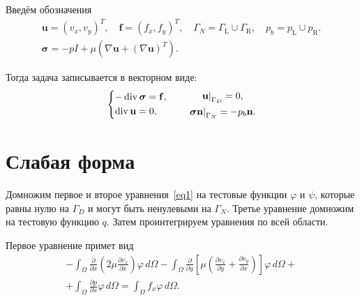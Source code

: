 \documentclass[a4paper,14pt]{extarticle}
\begin{document}
Введём обозначения
\begin{equation}
	\begin{gathered}
	\mathbf u=(v_x,v_y)^T,
	\quad
	\mathbf f=(f_x,f_y)^T,
	\quad
	\Gamma_N=\Gamma_{\mathrm L}\cup\Gamma_{\mathrm R},
	\quad
	p_b=p_{\mathrm L}\cup p_{\mathrm R}. \\[6pt]
	\boldsymbol\sigma
	=
	-pI
	+
	\mu\left(
		\nabla\mathbf u+(\nabla\mathbf u)^T
	\right).
	\end{gathered}
\end{equation}

Тогда задача записывается в векторном виде:
\begin{equation}
	\begin{dcases}
		-\operatorname{div}\boldsymbol\sigma
		=
		\mathbf f,
		\\
		\operatorname{div}\mathbf u=0,
	\end{dcases}
	\qquad
	\begin{gathered}
		\left.\mathbf u\right|_{\Gamma_D}=0,
		\\
		\left.
		\boldsymbol\sigma\mathbf n
		\right|_{\Gamma_N}
		=
		-p_b\mathbf n.
	\end{gathered}
	\label{eq:stokes_vector}
\end{equation}
	
\section{Слабая форма}

Домножим первое и второе уравнения~\eqref{eq1}
на тестовые функции $\varphi$ и $\psi$, которые равны нулю
на $\Gamma_D$ и могут быть ненулевыми на $\Gamma_N$.
Третье уравнение домножим на тестовую функцию $q$.
Затем проинтегрируем уравнения по всей области.

Первое уравнение примет вид
\begin{equation}
	\begin{gathered}
		-\int_\Omega
		\frac{\partial}{\partial x}
		\left(
			2\mu\frac{\partial v_x}{\partial x}
		\right)
		\varphi\,d\Omega
		-
		\int_\Omega
		\frac{\partial}{\partial y}
		\left[
			\mu\left(
				\frac{\partial v_x}{\partial y}
				+
				\frac{\partial v_y}{\partial x}
			\right)
		\right]
		\varphi\,d\Omega
		+\\[6pt]
		+
		\int_\Omega
		\frac{\partial p}{\partial x}
		\varphi\,d\Omega
		=
		\int_\Omega f_x\varphi\,d\Omega.
	\end{gathered}
\end{equation}
\end{document}

